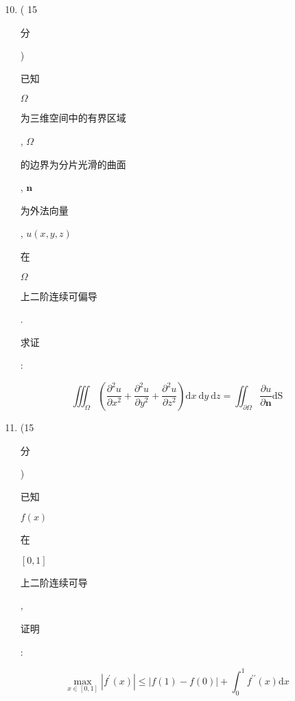 \documentclass[10pt]{article}
\begin{document}
\begin{enumerate}
  \setcounter{enumi}{9}
  \item ( 15 \begin{CJK}{UTF8}{mj}分\end{CJK}) \begin{CJK}{UTF8}{mj}已知\end{CJK} $\Omega$ \begin{CJK}{UTF8}{mj}为三维空间中的有界区域\end{CJK}, $\Omega$ \begin{CJK}{UTF8}{mj}的边界为分片光滑的曲面\end{CJK}, $\mathbf{n}$ \begin{CJK}{UTF8}{mj}为外法向量\end{CJK}, $u(x, y, z)$ \begin{CJK}{UTF8}{mj}在\end{CJK} $\Omega$ \begin{CJK}{UTF8}{mj}上二阶连续可偏导\end{CJK}. \begin{CJK}{UTF8}{mj}求证\end{CJK}:
\end{enumerate}
$$
\iiint_{\Omega}\left(\frac{\partial^{2} u}{\partial x^{2}}+\frac{\partial^{2} u}{\partial y^{2}}+\frac{\partial^{2} u}{\partial z^{2}}\right) \mathrm{d} x \mathrm{~d} y \mathrm{~d} z=\iint_{\partial \Omega} \frac{\partial u}{\partial \mathbf{n}} \mathrm{dS}
$$

\begin{enumerate}
  \setcounter{enumi}{10}
  \item (15 \begin{CJK}{UTF8}{mj}分\end{CJK}) \begin{CJK}{UTF8}{mj}已知\end{CJK} $f(x)$ \begin{CJK}{UTF8}{mj}在\end{CJK} $[0,1]$ \begin{CJK}{UTF8}{mj}上二阶连续可导\end{CJK}, \begin{CJK}{UTF8}{mj}证明\end{CJK}:
\end{enumerate}
$$
\max _{x \in[0,1]}\left|f^{\prime}(x)\right| \leq|f(1)-f(0)|+\int_{0}^{1} f^{\prime \prime}(x) \mathrm{d} x
$$
\end{document}
